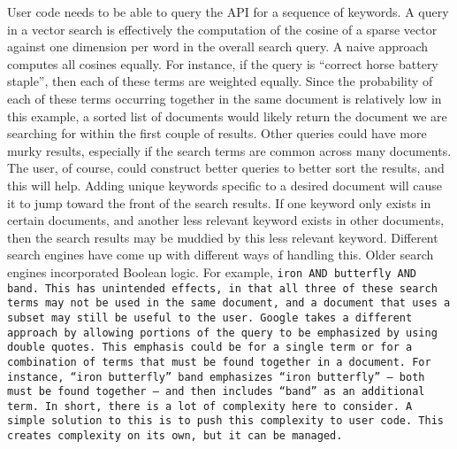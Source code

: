 User code needs to be able to query the API for a sequence of keywords. A query
in a vector search is effectively the computation of the cosine of a sparse
vector against one dimension per word in the overall search query.  A naive
approach computes all cosines equally.  For instance, if the query is ``correct
horse battery staple'', then each of these terms are weighted equally.  Since
the probability of each of these terms occurring together in the same document
is relatively low in this example, a sorted list of documents would likely
return the document we are searching for within the first couple of results.
Other queries could have more murky results, especially if the search terms are
common across many documents.  The user, of course, could construct better
queries to better sort the results, and this will help.  Adding unique keywords
specific to a desired document will cause it to jump toward the front of the
search results.  If one keyword only exists in certain documents, and another
less relevant keyword exists in other documents, then the search results may be
muddied by this less relevant keyword.  Different search engines have come up
with different ways of handling this.  Older search engines incorporated Boolean
logic. For example, \tt{iron AND butterfly AND band}.  This has unintended
effects, in that all three of these search terms may not be used in the same
document, and a document that uses a subset may still be useful to the user.
Google takes a different approach by allowing portions of the query to be
emphasized by using double quotes.  This emphasis could be for a single term or
for a combination of terms that must be found together in a document.  For
instance, \tt{``iron butterfly'' band} emphasizes ``iron butterfly'' -- both
must be found together -- and then includes ``band'' as an additional term. In
short, there is a lot of complexity here to consider.  A simple solution to this
is to push this complexity to user code. This creates complexity on its own, but
it can be managed.

